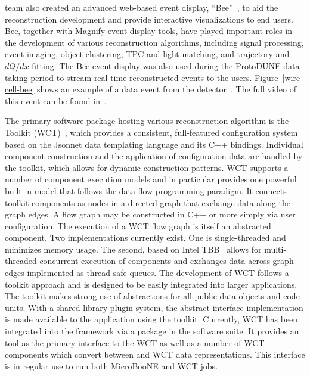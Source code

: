  team also created an advanced web-based \threed event display, ``Bee''~\cite{wire-cell-bee}, to aid the reconstruction development and provide interactive visualizations to end users.  Bee, together with \twod Magnify event 
display tools, have played important roles in 
the development of various reconstruction algorithms, including signal processing, \threed event 
imaging, object clustering, TPC and light matching, and trajectory and $dQ/dx$ fitting. The Bee event display 
was also used during the ProtoDUNE data-taking period to stream real-time reconstructed events to the users.
Figure~\ref{wire-cell-bee} shows an example of a data event from the  detector~\cite{ref:wc_bee}. 
The full video of this event can be found in~\cite{ref:bee_video}.

The primary software package hosting various  reconstruction algorithm is the 
 Toolkit (WCT)~\cite{ref:wire_cell_toolkit}, 
which provides a consistent, 
full-featured configuration system based on the Jsonnet \cite{jsonnet} data templating 
language and its C++ bindings.  Individual component construction and the application of
configuration data are handled by the toolkit, which allows for dynamic
construction patterns.  WCT supports a number of component execution models and in particular
provides one powerful built-in  model that follows the data flow
programming paradigm.  It connects toolkit components as nodes in a
directed graph that exchange data along the graph edges.  A flow graph
may be constructed in C++ or more simply via user configuration. The execution of a WCT 
flow graph is itself an abstracted component.  Two implementations currently exist.
One is single-threaded and minimizes memory usage.  The
second, based on Intel TBB~\cite{tbb} allows for multi-threaded
concurrent execution of components and exchanges data across graph edges
implemented as thread-safe queues. The development of WCT follows a toolkit approach
and is designed to be easily integrated into larger applications. The toolkit makes strong use of 
abstractions for all public data objects and code units. With a shared library 
plugin system, the abstract interface implementation is made available to the application
using the toolkit. Currently, WCT has been integrated into the  framework via a
package in the  software suite.  It provides an  tool as the primary 
interface to the WCT as well as a number of WCT components which convert between  
and WCT data representations. This interface is in regular use to run both MicroBooNE and 
 WCT jobs.



